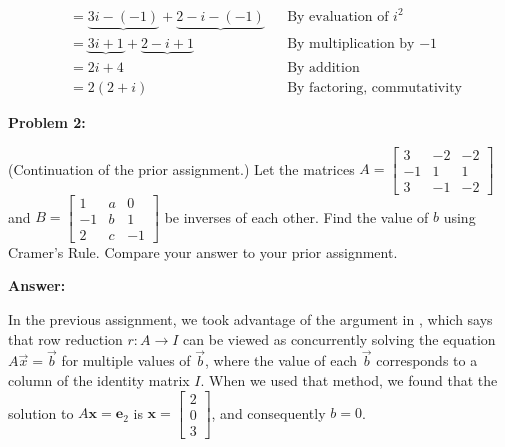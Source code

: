 \documentclass[10pt,letterpaper,final]{report}
\newcommand{\reason}[1]{&& \text{#1}}
\begin{document}
\begin{enumerate}[label=(\alph*)]
\begin{align*}
                 & = \underbrace{3i - (-1)} + \underbrace{2 - i - (-1)} \reason{By evaluation of $i^2$}                                                                                                        \\[1ex]
                 & = \underbrace{3i + 1} + \underbrace{2 - i + 1} \reason{By multiplication by $-1$}                                                                                                           \\[1ex]
                 & = 2i + 4 \reason{By addition}                                                                                                                                                               \\[1ex]
                 & = 2(2 + i) \reason{By factoring, commutativity}
        \end{align*}
\end{enumerate}


\pagebreak
\noindent\textbf{Problem 2:}
\medskip

(Continuation of the prior assignment.) Let the matrices $A = \begin{bmatrix}
    3  & -2 & -2 \\
    -1 & 1  & 1  \\
    3  & -1 & -2
  \end{bmatrix}$ and $B = \begin{bmatrix}
    1  & a & 0  \\
    -1 & b & 1  \\
    2  & c & -1
  \end{bmatrix}$ be inverses of each other. Find the value of $b$ using Cramer's Rule. Compare your answer to your prior assignment.

\medskip
\noindent\textbf{Answer:}

In the previous assignment, we took advantage of the argument in \textcite[Ch. 2.2, p.~117]{LayEtAl2020LinearAlgebraAndItsApplications}, which says that row reduction $r: A \to I$ can be viewed as concurrently solving the equation $A\vec{x} = \vec{b}$ for multiple values of $\vec{b}$, where the value of each $\vec{b}$ corresponds to a column of the identity matrix $I$. When we used that method, we found that the solution to $A\mathbf{x} = \mathbf{e}_2$ is $\mathbf{x} = \begin{bmatrix}
    2 \\0\\3
  \end{bmatrix}$, and consequently $b = 0$.
\end{document}
